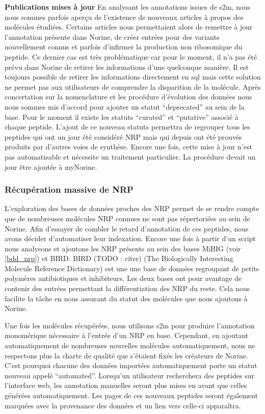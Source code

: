 \textbf{Publications mises à jour} 
En analysant les annotations issues de s2m, nous nous sommes parfois aperçu de l'existence de nouveaux articles à propos des molécules étudiées.
Certains articles nous permettaient alors de remettre à jour l'annotation présente dans Norine, de créer entrées pour des variants nouvellement connus et parfois d'infirmer la production non ribosomique du peptide.
Ce dernier cas est très problématique car pour le moment, il n'a pas été prévu dans Norine de retirer les informations d'une quelconque manière.
Il est toujours possible de retirer les informations directement en sql mais cette solution ne permet pas aux utilisateurs de comprendre la disparition de la molécule.
Après concertation sur la nomenclature et les procédure d'évolution des données nous nous sommes mis d'accord pour ajouter un statut ``deprecated'' au sein de la base.
Pour le moment il existe les statuts ``curated'' et ``putative'' associé à chaque peptide.
L'ajout de ce nouveau statuts permettra de regrouper tous les peptides qui ont un jour été considéré NRP mais qui depuis ont été prouvés produits par d'autres voies de synthèse.
Encore une fois, cette mise à jour n'est pas automatisable et nécessite un traitement particulier.
La procédure devait un jour être ajoutée à myNorine.


\subsubsection{Récupération massive de NRP}

L'exploration des bases de données proches des NRP permet de se rendre compte que de nombreuses molécules NRP connues ne sont pas répertoriées au sein de Norine.
Afin d'essayer de combler le retard d'annotation de ces peptides, nous avons décider d'automatiser leur indexation.
Encore une fois à partir d'un script nous analysons et ajoutons les NRP présents au sein des bases MiBIG (voir \ref{bdd_nrp}) et BIRD.
BIRD (TODO : citer) (The Biologically Interesting Molecule Reference Dictionary) est une une base de données regroupant de petits polymères antibiotiques et inhibiteurs.
Les deux bases ont pour avantage de contenir des entrées permettant la différentiation des NRP du reste.
Cela nous facilite la tâche en nous assurant du statut des molécules que nous ajoutons à Norine.

Une fois les molécules récupérées, nous utilisons s2m pour produire l'annotation monomérique nécessaire à l'entrée d'un NRP en base.
Cependant, en ajoutant automatiquement de nombreuses nouvelles molécules automatiquement, nous ne respectons plus la charte de qualité que s'étaient fixés les créateurs de Norine.
C'est pourquoi chacune des données importées automatiquement porte un statut nouveau appelé ``automated''.
Lorsqu'un utilisateur recherchera des peptides sur l'interface web, les annotation manuelles seront plus mises en avant que celles générées automatiquement.
Les pages de ces nouveaux peptides seront également marquées avec la provenance des données et un lien vers celle-ci apparaîtra.


